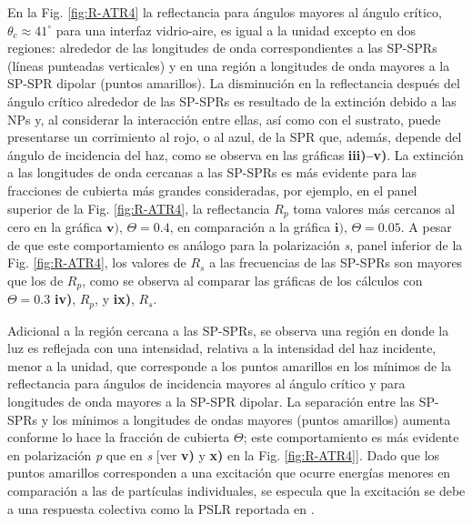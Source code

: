 En la Fig.  \ref{fig:R-ATR4} la reflectancia para ángulos mayores al ángulo crítico, $\theta_c \approx 41^\circ $ para una interfaz vidrio-aire, es igual a la unidad excepto en dos regiones: alrededor de las longitudes de onda correspondientes a las SP-SPRs (líneas punteadas verticales) y en una región a longitudes de onda mayores a la SP-SPR dipolar (puntos amarillos). La disminución en la reflectancia después del ángulo crítico alrededor de las SP-SPRs es resultado de la extinción debido a las NPs y, al considerar la interacción entre ellas, así como con el sustrato, puede presentarse un corrimiento al rojo, o al azul, de la SPR que, además, depende del ángulo de incidencia del haz, como se observa en las gráficas \textbf{iii)--v)}. La extinción a las longitudes de onda cercanas a las SP-SPRs es más evidente para las fracciones de cubierta más grandes consideradas, por ejemplo, en el panel superior de la Fig. \ref{fig:R-ATR4}, la reflectancia $R_p$ toma valores más cercanos al cero en la gráfica $\mathbf{v)}$, $\Theta = 0.4$,  en comparación a la gráfica $\mathbf{i)}$, $\Theta = 0.05$. A pesar de que este comportamiento es análogo para la polarización \emph{s}, panel inferior de la  Fig. \ref{fig:R-ATR4}, los valores de $R_s$ a las frecuencias de las SP-SPRs son mayores que los de $R_p$, como se observa al comparar las gráficas de los cálculos con $\Theta=0.3$ \textbf{iv)}, $R_p$, y \textbf{ix)}, $R_s$.


Adicional a la región cercana a las SP-SPRs, se observa una región en donde la luz es reflejada con una intensidad, relativa a la intensidad del haz incidente, menor a la unidad, que corresponde a los puntos amarillos en los mínimos de la reflectancia para ángulos de incidencia mayores al ángulo crítico y para longitudes de onda mayores a la SP-SPR dipolar. La separación entre las SP-SPRs y los mínimos a longitudes de ondas mayores (puntos amarillos) aumenta conforme lo hace la fracción de cubierta $\Theta$; este comportamiento es más evidente en polarización \emph{p} que en \emph{s} [ver \textbf{v)} y \textbf{x)} en la Fig.  \ref{fig:R-ATR4}].  Dado que los puntos amarillos corresponden a una excitación que ocurre energías  menores en comparación a las de partículas individuales, se especula que la excitación se debe a una respuesta colectiva como la PSLR reportada en \cite{danilov2018ultra}.
  
